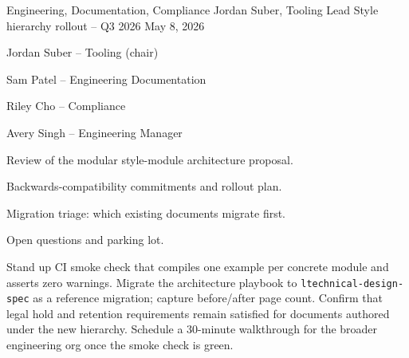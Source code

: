 \documentclass[11pt]{article}
\begin{document}
\makedoctitle

\memoheader
  {Engineering, Documentation, Compliance}
  {Jordan Suber, Tooling Lead}
  {Style hierarchy rollout -- Q3 2026}
  {May 8, 2026}

\begin{attendees}
  \item Jordan Suber -- Tooling (chair)
  \item Sam Patel -- Engineering Documentation
  \item Riley Cho -- Compliance
  \item Avery Singh -- Engineering Manager
\end{attendees}

\begin{agenda}
  \item Review of the modular style-module architecture proposal.
  \item Backwards-compatibility commitments and rollout plan.
  \item Migration triage: which existing documents migrate first.
  \item Open questions and parking lot.
\end{agenda}

\begin{decisions}
\end{decisions}

\begin{actionitems}
             {Stand up CI smoke check that compiles one example per concrete
              module and asserts zero warnings.}
             {Migrate the architecture playbook to
              \texttt{ltechnical-design-spec} as a reference
              migration; capture before/after page count.}
             {Confirm that legal hold and retention requirements remain
              satisfied for documents authored under the new hierarchy.}
             {Schedule a 30-minute walkthrough for the broader
              engineering org once the smoke check is green.}
\end{actionitems}
\end{document}
